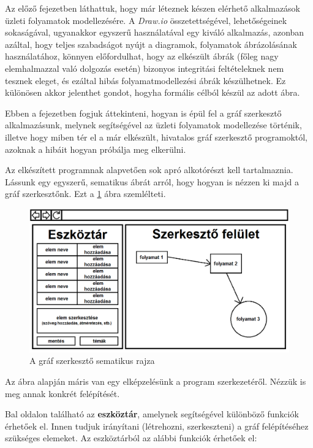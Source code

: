 

Az előző fejezetben láthattuk, hogy már léteznek készen elérhető alkalmazások üzleti folyamatok modellezésére. A \textit{Draw.io} összetettségével, lehetőségeinek sokaságával, ugyanakkor egyszerű használatával egy kiváló alkalmazás, azonban azáltal, hogy teljes szabadságot nyújt a diagramok, folyamatok ábrázolásának használatához, könnyen előfordulhat, hogy az elkészült ábrák (főleg nagy elemhalmazzal való dolgozás esetén) bizonyos integritási feltételeknek nem tesznek eleget, és ezáltal hibás folyamatmodellezési ábrák készülhetnek. Ez különösen akkor jelenthet gondot, hogyha formális célból készül az adott ábra.

Ebben a fejezetben fogjuk áttekinteni, hogyan is épül fel a gráf szerkesztő alkalmazásunk, melynek segítségével az üzleti folyamatok modellezése történik, illetve hogy miben tér el a már elkészült, hivatalos gráf szerkesztő programoktól, azoknak a hibáit hogyan próbálja meg elkerülni.


Az elkészített programnak alapvetően sok apró alkotórészt kell tartalmaznia. Lássunk egy egyszerű, sematikus ábrát arról, hogy hogyan is nézzen ki majd a gráf szerkesztőnk. Ezt a \ref{fig:sematikus} ábra szemlélteti.

\begin{figure}[h]
\centering
\includegraphics[scale=0.5]{images/sematikus.png}
\caption{A gráf szerkesztő sematikus rajza}
\label{fig:sematikus}
\end{figure}

Az ábra alapján máris van egy elképzelésünk a program szerkezetéről. Nézzük is meg annak konkrét felépítését.

Bal oldalon található az \textbf{eszköztár}, amelynek segítségével különböző funkciók érhetőek el. Innen tudjuk irányítani (létrehozni, szerkeszteni) a gráf felépítéséhez szükséges elemeket. Az eszköztárból az alábbi funkciók érhetőek el:

